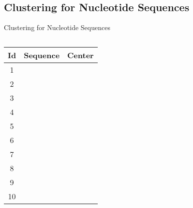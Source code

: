 \documentclass{beamer}
\begin{document}

\subsection{Clustering for Nucleotide Sequences}

\begin{frame}{Clustering for Nucleotide Sequences}

\begin{columns}
\begin{column}{0.5\textwidth}
{\footnotesize
\begin{tabular}{cll} \hline\hline
Id & Sequence             & Center \\ \hline
1  &  {} {} {} {} {} {} {} {} &
     \multirow{4}{*}{ {} {} {} {} {} {} {} {}} \\
2  &  {} {} {} {} {} {} {} {} & \\
3  &  {} {} {} {} {} {} {} {} & \\
4  &  {} {} {} {} {} {} {} {} & \\ \hline
5  &  {} {} {} {} {} {} {} {} &
     \multirow{2}{*}{ {} {} {} {} {} {} {} {}} \\
6  &  {} {} {} {} {} {} {} {} & \\ \hline
7  &  {} {} {} {} {} {} {} {} &
     \multirow{2}{*}{ {} {} {} {} {} {} {} {}} \\
8  &  {} {} {} {} {} {} {} {} & \\ \hline
9  &  {} {} {} {} {} {} {} {} &
     \multirow{2}{*}{ {} {} {} {} {} {} {} {}} \\
10 &  {} {} {} {} {} {} {} {} & \\ \hline\hline
\end{tabular}
}
\end{column}


\end{columns}
\end{frame}
\end{document}
